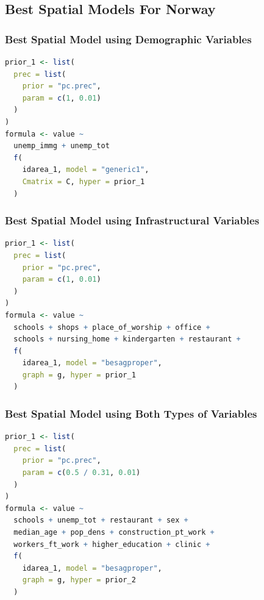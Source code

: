 \subsection{Best Spatial Models For Norway}
\subsubsection{Best Spatial Model using Demographic Variables}
\begin{lstlisting}[caption={The code for the demographic model.}, label={codeDemoNorway}, language = R]
prior_1 <- list(
  prec = list(
    prior = "pc.prec",
    param = c(1, 0.01)
  )
)
formula <- value ~
  unemp_immg + unemp_tot
  f(
    idarea_1, model = "generic1",
    Cmatrix = C, hyper = prior_1
  )
\end{lstlisting}
\subsubsection{Best Spatial Model using Infrastructural Variables}
\begin{lstlisting}[caption={The code for the infrastructural model.}, label={codeInfraNorway}, language = R]
prior_1 <- list(
  prec = list(
    prior = "pc.prec",
    param = c(1, 0.01)
  )
)
formula <- value ~
  schools + shops + place_of_worship + office +
  schools + nursing_home + kindergarten + restaurant +
  f(
    idarea_1, model = "besagproper",
    graph = g, hyper = prior_1
  )
\end{lstlisting}
\subsubsection{Best Spatial Model using Both Types of Variables}
\begin{lstlisting}[caption={The code for the demographic + infrastructure model.}, label={codeBothNorway}, language=R]
prior_1 <- list(
  prec = list(
    prior = "pc.prec",
    param = c(0.5 / 0.31, 0.01)
  )
)
formula <- value ~
  schools + unemp_tot + restaurant + sex + 
  median_age + pop_dens + construction_pt_work +
  workers_ft_work + higher_education + clinic +
  f(
    idarea_1, model = "besagproper",
    graph = g, hyper = prior_2
  )
\end{lstlisting}
\clearpage